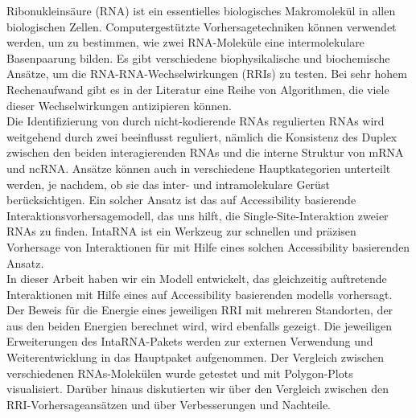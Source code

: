 \documentclass[twoside,a4paper]{report}
\numberwithin{equation}{section}
\begin{document}
Ribonukleinsäure (RNA) ist ein essentielles biologisches Makromolekül in allen biologischen Zellen. Computergestützte Vorhersagetechniken können verwendet werden, um zu bestimmen, wie zwei RNA-Moleküle eine intermolekulare Basenpaarung bilden. Es gibt verschiedene biophysikalische und biochemische Ansätze, um die RNA-RNA-Wechselwirkungen (RRIs) zu testen. Bei sehr hohem Rechenaufwand gibt es in der Literatur eine Reihe von Algorithmen, die viele dieser Wechselwirkungen antizipieren können. \\

Die Identifizierung von durch nicht-kodierende RNAs regulierten RNAs wird weitgehend durch zwei beeinflusst reguliert, nämlich die Konsistenz des Duplex zwischen den beiden interagierenden RNAs und die interne Struktur von mRNA und ncRNA. Ansätze können auch in verschiedene Hauptkategorien unterteilt werden, je nachdem, ob sie das inter- und intramolekulare Gerüst berücksichtigen. Ein solcher Ansatz ist das auf Accessibility basierende Interaktionsvorhersagemodell, das uns hilft, die Single-Site-Interaktion zweier RNAs zu finden. IntaRNA ist ein Werkzeug zur schnellen und präzisen Vorhersage von Interaktionen für mit Hilfe eines solchen Accessibility basierenden Ansatz.  \\

In dieser Arbeit haben wir ein Modell entwickelt, das gleichzeitig auftretende Interaktionen mit Hilfe eines auf Accessibility basierenden modells vorhersagt. Der Beweis für die Energie eines jeweiligen RRI mit mehreren Standorten, der aus den beiden Energien berechnet wird, wird ebenfalls gezeigt. Die jeweiligen Erweiterungen des IntaRNA-Pakets werden zur externen Verwendung und Weiterentwicklung in das Hauptpaket aufgenommen. Der Vergleich zwischen verschiedenen RNAs-Molekülen wurde getestet und mit Polygon-Plots visualisiert. Darüber hinaus diskutierten wir über den Vergleich zwischen den RRI-Vorhersageansätzen und über Verbesserungen und Nachteile.\\


	
	
	\tableofcontents
	 	
\end{document}
